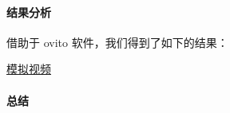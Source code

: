\documentclass[
]{article}
\begin{document}
\hypertarget{header-n170}{%
\paragraph{结果分析}\label{header-n170}}

借助于 ovito 软件，我们得到了如下的结果：

\href{1_md2_lammps/o_example_A1T300/a1T300.avi}{模拟视频}

\hypertarget{header-n174}{%
\paragraph{总结}\label{header-n174}}
\end{document}
